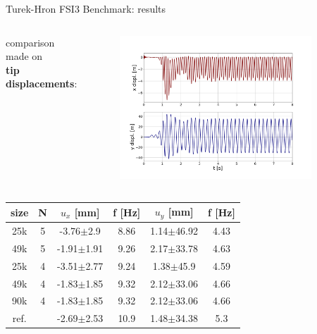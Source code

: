 \documentclass[10pt,t]{beamer}
\begin{document}
\begin{frame}{Turek-Hron FSI3 Benchmark: results}

\begin{columns}

comparison made on \\ \textbf{tip displacements}:



\vspace{-1cm}
\begin{figure}[htbp!]
	\includegraphics[width=0.9\textwidth, trim=20 20 20 20, clip]{images/FSI3/fsi3_displ_pres.png}
\end{figure}


\end{columns}



\footnotesize
\begin{table}[h!]
\label{tab:fsi3_d}
\begin{center}
\begin{tabular}{ c | c | c c | c c  }
size & N & $u_x$ [\si{mm}] & f [\si{Hz}] & $u_y$ [\si{mm}]  & f [\si{Hz}] \\
\hline
25k & 5   & -3.76$\pm$2.9 & 8.86 & 1.14$\pm$46.92 & 4.43   \\
\hline
49k  & 5   & -1.91$\pm$1.91   & 9.26 & 2.17$\pm$33.78 & 4.63 \\
\hline
25k & 4 & -3.51$\pm$2.77 & 9.24 & 1.38$\pm$45.9 & 4.59   \\
\hline
49k  & 4   & -1.83$\pm$1.85   & 9.32 & 2.12$\pm$33.06 & 4.66 \\
\hline
90k  & 4   & -1.83$\pm$1.85   & 9.32 & 2.12$\pm$33.06 & 4.66 \\
\hline
\hline
ref.  &  & -2.69$\pm$2.53  & 10.9 & 1.48$\pm$34.38 & 5.3  \\
\hline
\end{tabular}
\end{center}
\end{table}


\end{frame}
\end{document}
